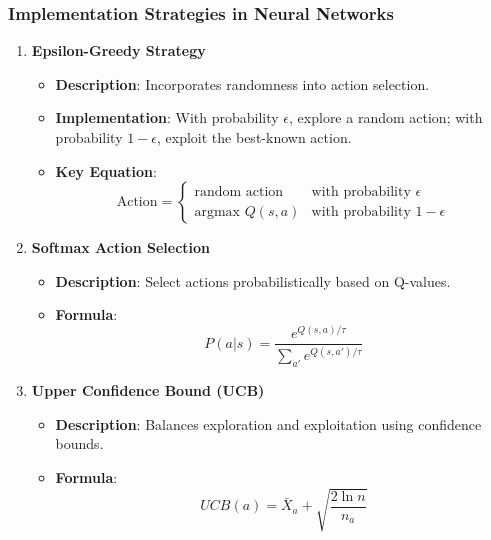 \documentclass[aspectratio=169]{beamer}
\begin{document}
\begin{frame}[fragile]
    \frametitle{Implementation Strategies in Neural Networks}
    \begin{enumerate}
        \item \textbf{Epsilon-Greedy Strategy}
        \begin{itemize}
            \item \textbf{Description}: Incorporates randomness into action selection.
            \item \textbf{Implementation}: With probability \( \epsilon \), explore a random action; with probability \( 1 - \epsilon \), exploit the best-known action.
            \item \textbf{Key Equation}:
            \begin{equation}
                \text{Action} = 
                \begin{cases} 
                \text{random action} & \text{with probability } \epsilon \\
                \text{argmax } Q(s, a) & \text{with probability } 1 - \epsilon
                \end{cases}
            \end{equation}
        \end{itemize}

        \item \textbf{Softmax Action Selection}
        \begin{itemize}
            \item \textbf{Description}: Select actions probabilistically based on Q-values.
            \item \textbf{Formula}:
            \begin{equation}
                P(a|s) = \frac{e^{Q(s, a)/\tau}}{\sum_{a'} e^{Q(s, a')/\tau}}
            \end{equation}
        \end{itemize}

        \item \textbf{Upper Confidence Bound (UCB)}
        \begin{itemize}
            \item \textbf{Description}: Balances exploration and exploitation using confidence bounds.
            \item \textbf{Formula}:
            \begin{equation}
                UCB(a) = \bar{X}_a + \sqrt{\frac{2 \ln n}{n_a}}
            \end{equation}
        \end{itemize}
    \end{enumerate}
\end{frame}
\end{document}
